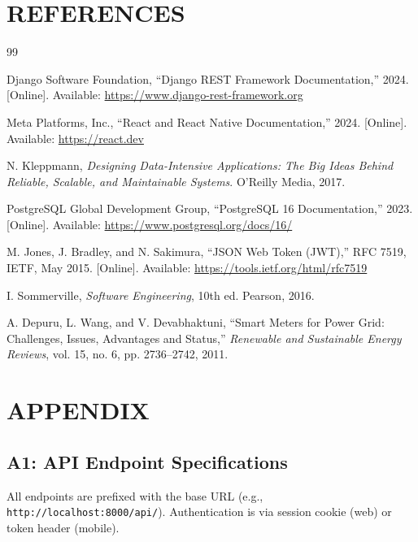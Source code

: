 \documentclass[12pt, a4paper, onecolumn]{report}
\begin{document}
\chapter*{REFERENCES}
\begin{thebibliography}{99}

Django Software Foundation, ``Django REST Framework Documentation,'' 2024. [Online]. Available: \url{https://www.django-rest-framework.org}

Meta Platforms, Inc., ``React and React Native Documentation,'' 2024. [Online]. Available: \url{https://react.dev}

N. Kleppmann, \textit{Designing Data-Intensive Applications: The Big Ideas Behind Reliable, Scalable, and Maintainable Systems}. O'Reilly Media, 2017.

PostgreSQL Global Development Group, ``PostgreSQL 16 Documentation,'' 2023. [Online]. Available: \url{https://www.postgresql.org/docs/16/}

M. Jones, J. Bradley, and N. Sakimura, ``JSON Web Token (JWT),'' RFC 7519, IETF, May 2015. [Online]. Available: \url{https://tools.ietf.org/html/rfc7519}

I. Sommerville, \textit{Software Engineering}, 10th ed. Pearson, 2016.

A. Depuru, L. Wang, and V. Devabhaktuni, ``Smart Meters for Power Grid: Challenges, Issues, Advantages and Status,'' \textit{Renewable and Sustainable Energy Reviews}, vol. 15, no. 6, pp. 2736--2742, 2011.

\end{thebibliography}

\chapter*{APPENDIX}

\section*{A1: API Endpoint Specifications}
All endpoints are prefixed with the base URL (e.g., \texttt{http://localhost:8000/api/}). Authentication is via session cookie (web) or token header (mobile).

\end{document}
